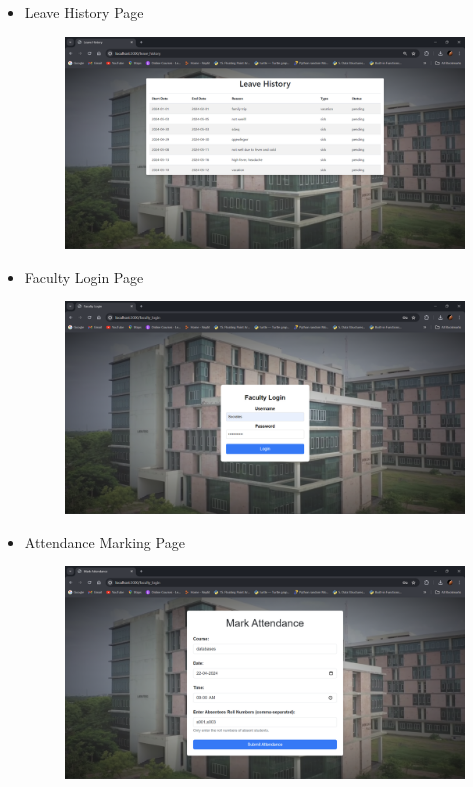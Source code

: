 \documentclass{article}
\begin{document}
\begin{itemize}
    \vspace*{2cm}

    \item \thispagestyle{empty}
    {\large{Leave History Page}}
    \begin{figure}[H]
        \centering
        \includegraphics[width=1.1\textwidth, center]{16}
    \end{figure}
    
    \newpage

    \item \thispagestyle{empty}
    {\large{Faculty Login Page}}
    \begin{figure}[H]
        \centering
        \includegraphics[width=1.1\textwidth, center]{17}
    \end{figure}

    \vspace*{2cm}

    \item \thispagestyle{empty}
    {\large{Attendance Marking Page}}
    \begin{figure}[H]
        \centering
        \includegraphics[width=1.1\textwidth, center]{18}
    \end{figure}


\end{itemize}
\end{document}

